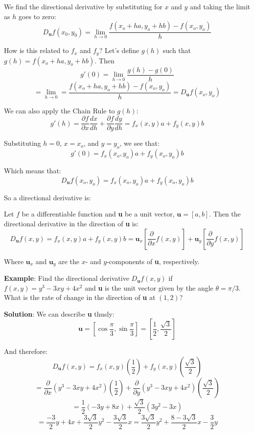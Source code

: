 We find the directional derivative by substituting for $x$ and $y$ and taking 
the limit as $h$ goes to zero:
$$D_{\textbf{u}} f(x_0, y_0) = \lim_{h \to 0} \frac{f(x_o + ha, y_o + hb) - 
f(x_o, y_o)}{h}$$

How is this related to $f_x$ and $f_y$? Let's define $g(h)$ such that $g(h) = 
f(x_o + ha, y_o + hb)$. Then
$$g'(0) = \lim_{h \to 0} \frac{g(h) - g(0)}{h}$$
$$= \lim_{h \to 0} = \frac{f(x_o + ha, y_o + hb) - f(x_o, y_o)}{h} = 
D_{\textbf{u}} f(x_o, y_o)$$

We can also apply the Chain Rule to $g(h)$:
$$g'(h) = \frac{\partial f}{\partial x} \frac{dx}{dh} + \frac{\partial f}{
\partial y} \frac{dy}{dh} = f_x(x, y)a + f_y(x, y)b$$

Substituting $h = 0$, $x = x_o$, and $y = y_o$, we see that:
$$g'(0) = f_x(x_o, y_o)a + f_y(x_o, y_o)b$$

Which means that:
$$D_{\textbf{u}} f(x_o, y_o) = f_x(x_o, y_o)a + f_y(x_o, y_o)b$$

So a directional derivative is:

\begin{mdframed}[style = important, frametitle = {The Directional Derivative}]
Let $f$ be a differentiable function and \textbf{u} be a unit vector, 
$\textbf{u} = \left[ a, b \right]$. Then the directional derivative in the 
direction of \textbf{u} is:
$$D_{\textbf{u}} f(x, y) = f_x(x, y)a + f_y(x, y)b = \textbf{u}_x \left[ 
\frac{\partial}{\partial x} f(x, y) \right] + \textbf{u}_y \left[ \frac{
\partial}{\partial y} f(x, y) \right]$$
\end{mdframed}

Where $\textbf{u}_x$ and $\textbf{u}_y$ are the $x$- and $y$-components of 
\textbf{u}, respectively. 

\textbf{Example}: Find the directional derivative $D_{\textbf{u}} f(x, y)$ if 
$f(x, y) = y^3 - 3xy + 4x^2$ and \textbf{u} is the unit vector given by the 
angle $\theta = \pi/3$. What is the rate of change in the direction of 
\textbf{u} at $(1, 2)$?

\textbf{Solution}: We can describe \textbf{u} thusly:
$$\textbf{u} = \left[ \cos{ \frac{\pi}{3} }, \sin{ \frac{\pi}{3}} \right] = 
\left[ \frac{1}{2}, \frac{\sqrt{3}}{2} \right]$$

And therefore:
$$D_{\textbf{u}} f(x, y) = f_x(x, y) \left( \frac{1}{2} \right) + f_y(x, y) 
\left( \frac{\sqrt{3}}{2} \right) $$
$$= \frac{\partial}{\partial x} \left( y^3 - 3xy + 4x^2 \right) \left( 
\frac{1}{2} \right) + \frac{\partial}{\partial y} \left( y^3 - 3xy + 4x^2 
\right) \left( \frac{\sqrt{3}}{2} \right)$$
$$= \frac{1}{2} \left( -3y + 8x \right) + \frac{\sqrt{3}}{2} \left( 3y^2 - 3x 
\right)$$
$$= \frac{-3}{2}y + 4x + \frac{3\sqrt{3}}{2}y^2 - \frac{3\sqrt{3}}{2}x = \frac{
3\sqrt{3}}{2}y^2 + \frac{8-3\sqrt{3}}{2}x - \frac{3}{2}y$$

